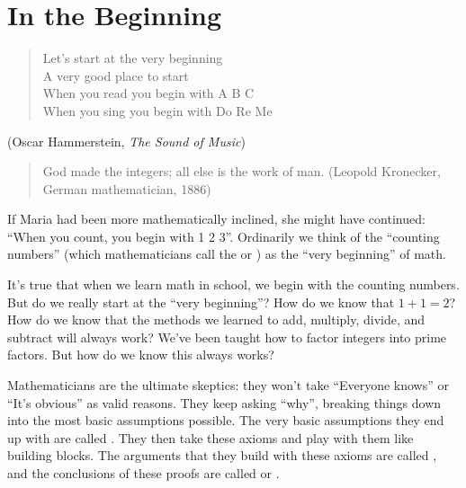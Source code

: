 
\section{In the Beginning\quad
{}}
\label{sec:Preliminaries:InTheBeginning}

\begin{verse}
Let's start at the very beginning\\
A very good place to start\\
When you read you begin with A B C\\
When you sing you begin with Do Re Me
\end{verse}

(Oscar Hammerstein, \emph{The Sound of Music})

\begin{quote}
God made the integers; all else is the work of man.
 (Leopold Kronecker, German mathematician, 1886)
\end{quote}
\bigskip

If Maria had been more mathematically inclined, she might have continued:  ``When you count, you begin with 1 2 3''. Ordinarily we think of the ``counting numbers''  (which mathematicians call the  or ) as the ``very beginning'' of math. 

It's true that when we learn math in school, we begin with the counting numbers. But do we really start at the ``very beginning''?   How do we know that $1 + 1 = 2$? How do we know that the methods we learned to add,  multiply, divide, and subtract will always work? We've been taught how to factor integers into prime factors. But how do we know this always works?

 Mathematicians  are the ultimate skeptics: they won't take ``Everyone knows'' or ``It's obvious''  as valid reasons. They keep asking ``why'', breaking things down into the most basic assumptions possible. The very basic assumptions they end up with are called . They then take these axioms and play with them like building blocks. The arguments that they build with these axioms are called , and the conclusions of these proofs are called  or .  

